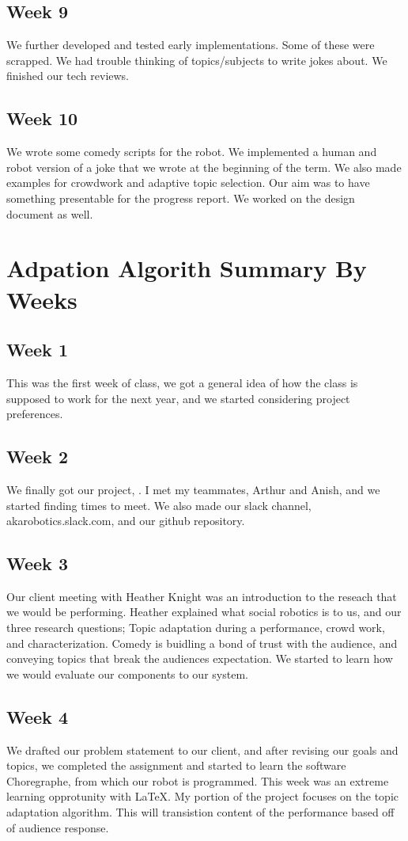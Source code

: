 \documentclass[onecolumn, draftclsnofoot,10pt, compsoc]{IEEEtran}
\begin{document}
\subsection{Week 9}
We further developed and tested early implementations. Some of these were scrapped. We had trouble thinking of topics/subjects to write jokes about. We finished our tech reviews.
\subsection{Week 10}
We wrote some comedy scripts for the robot. We implemented a human and robot version of a joke that we wrote at the beginning of the term. We also made examples for crowdwork and adaptive topic selection. Our aim was to have something presentable for the progress report. We worked on the design document as well.


\section{Adpation Algorith Summary By Weeks}

\subsection{Week 1}
	This was the first week of class, we got a general idea of how the class is supposed to work for the next year, and we started considering project preferences.
\subsection{Week 2}
	We finally got our project, . I met my teammates, Arthur and Anish, and we started finding times to meet. We also made our slack channel, akarobotics.slack.com, and our github repository.
\subsection{Week 3}
	Our client meeting with Heather Knight was an introduction to the reseach that we would be performing. Heather explained what social robotics is to us, and our three research questions; Topic adaptation during a performance, crowd work, and characterization. Comedy is buidling a bond of trust with the audience, and conveying topics that break the audiences expectation. We started to learn how we would evaluate our components to our system.
\subsection{Week 4}
	We drafted our problem statement to our client, and after revising our goals and topics, we completed the assignment and started to learn the software Choregraphe, from which our robot is programmed. This week was an extreme learning opprotunity with LaTeX. My portion of the project focuses on the topic adaptation algorithm. This will transistion content of the performance based off of audience response.
\end{document}
